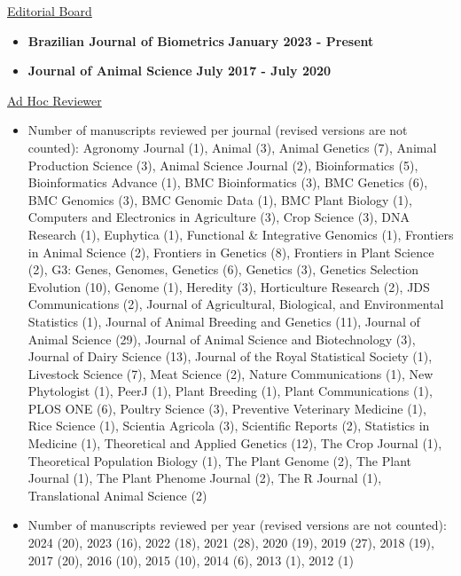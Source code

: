 \documentclass[margin,line,10pt]{res}
\begin{document}
\begin{resume}
\underline{Editorial Board}
 \vspace{.2cm}
\begin{itemize}
    \item {\bf Brazilian Journal of Biometrics} \hfill {\bf January 2023 - Present}
    \item {\bf Journal of Animal Science} \hfill  {\bf July 2017 - July 2020} 
\end{itemize}





\vspace{0.3cm}
\underline{Ad Hoc Reviewer}
\begin{itemize}
    \vspace{.1cm}
\item  Number of manuscripts reviewed per journal (revised versions are not counted): Agronomy Journal (1), Animal (3), Animal Genetics (7), Animal Production Science (3), Animal Science Journal (2), Bioinformatics (5), Bioinformatics Advance (1), BMC Bioinformatics (3), BMC Genetics (6), BMC Genomics (3), BMC Genomic Data (1), BMC Plant Biology (1), Computers and Electronics in Agriculture (3), Crop Science (3), DNA Research (1),  Euphytica (1), Functional \& Integrative Genomics (1), Frontiers in Animal Science (2), Frontiers in Genetics (8), Frontiers in Plant Science (2), G3: Genes, Genomes, Genetics (6), Genetics (3), Genetics Selection Evolution (10), Genome (1), Heredity (3), Horticulture Research (2), JDS Communications (2), Journal of Agricultural, Biological, and Environmental Statistics (1), Journal of Animal Breeding and Genetics (11), Journal of Animal Science (29), Journal of Animal Science and Biotechnology (3), Journal of Dairy Science (13), Journal of the Royal Statistical Society (1), Livestock Science (7), Meat Science (2), Nature Communications (1), New Phytologist (1), PeerJ (1), Plant Breeding (1), Plant Communications (1), PLOS ONE (6), Poultry Science (3), Preventive Veterinary Medicine (1), Rice Science (1), Scientia Agricola (3), Scientific Reports (2), Statistics in Medicine (1), Theoretical and Applied Genetics (12), The Crop Journal (1), Theoretical Population Biology (1), The Plant Genome (2), The Plant Journal (1), The Plant Phenome Journal (2), The R Journal (1), Translational Animal Science (2)  
  \vspace{.1cm}
  \item Number of manuscripts reviewed per year (revised versions are not counted): 2024 (20), 2023 (16), 2022 (18), 2021 (28), 2020 (19), 2019 (27), 2018 (19), 2017 (20), 2016 (10), 2015 (10), 2014 (6), 2013 (1), 2012 (1)
\end{itemize}




\end{resume}
\end{document}
